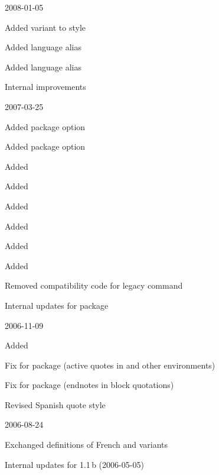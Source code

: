 \documentclass{ltxdockit}[2010/09/26]
\begin{document}
\begin{changelog}
\begin{release}{3.8}{2008-01-05}
\item Added variant  to style 
\item Added language alias 
\item Added language alias 
\item Internal improvements
\end{release}

\begin{release}{3.7}{2007-03-25}
\item Added package option 
\item Added package option 
\item Added 
\item Added 
\item Added 
\item Added 
\item Added 
\item Added 
\item Removed compatibility code for  legacy command
\item Internal updates for  package
\end{release}

\begin{release}{3.6}{2006-11-09}
\item Added 
\item Fix for  package (active quotes in  and other environments)
\item Fix for  package (endnotes in block quotations)
\item Revised Spanish quote style
\end{release}

\begin{release}{3.5}{2006-08-24}
\item Exchanged definitions of French  and  variants
\item Internal updates for  1.1\,b (2006-05-05)
\end{release}


\end{changelog}
\end{document}
